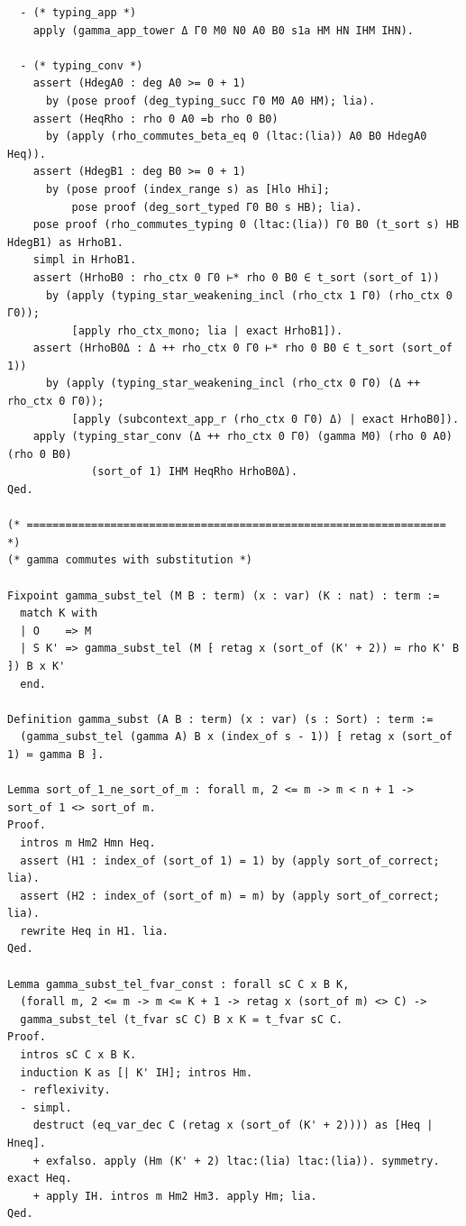 \begin{latin}
\begin{verbatim}
  - (* typing_app *)
    apply (gamma_app_tower Δ Γ0 M0 N0 A0 B0 s1a HM HN IHM IHN).

  - (* typing_conv *)
    assert (HdegA0 : deg A0 >= 0 + 1)
      by (pose proof (deg_typing_succ Γ0 M0 A0 HM); lia).
    assert (HeqRho : rho 0 A0 =b rho 0 B0)
      by (apply (rho_commutes_beta_eq 0 (ltac:(lia)) A0 B0 HdegA0 Heq)).
    assert (HdegB1 : deg B0 >= 0 + 1)
      by (pose proof (index_range s) as [Hlo Hhi];
          pose proof (deg_sort_typed Γ0 B0 s HB); lia).
    pose proof (rho_commutes_typing 0 (ltac:(lia)) Γ0 B0 (t_sort s) HB HdegB1) as HrhoB1.
    simpl in HrhoB1.
    assert (HrhoB0 : rho_ctx 0 Γ0 ⊢* rho 0 B0 ∈ t_sort (sort_of 1))
      by (apply (typing_star_weakening_incl (rho_ctx 1 Γ0) (rho_ctx 0 Γ0));
          [apply rho_ctx_mono; lia | exact HrhoB1]).
    assert (HrhoB0Δ : Δ ++ rho_ctx 0 Γ0 ⊢* rho 0 B0 ∈ t_sort (sort_of 1))
      by (apply (typing_star_weakening_incl (rho_ctx 0 Γ0) (Δ ++ rho_ctx 0 Γ0));
          [apply (subcontext_app_r (rho_ctx 0 Γ0) Δ) | exact HrhoB0]).
    apply (typing_star_conv (Δ ++ rho_ctx 0 Γ0) (gamma M0) (rho 0 A0) (rho 0 B0)
             (sort_of 1) IHM HeqRho HrhoB0Δ).
Qed.

(* ================================================================= *)
(* gamma commutes with substitution *)

Fixpoint gamma_subst_tel (M B : term) (x : var) (K : nat) : term :=
  match K with
  | O    => M
  | S K' => gamma_subst_tel (M ⁅ retag x (sort_of (K' + 2)) ≔ rho K' B ⁆) B x K'
  end.

Definition gamma_subst (A B : term) (x : var) (s : Sort) : term :=
  (gamma_subst_tel (gamma A) B x (index_of s - 1)) ⁅ retag x (sort_of 1) ≔ gamma B ⁆.

Lemma sort_of_1_ne_sort_of_m : forall m, 2 <= m -> m < n + 1 -> sort_of 1 <> sort_of m.
Proof.
  intros m Hm2 Hmn Heq.
  assert (H1 : index_of (sort_of 1) = 1) by (apply sort_of_correct; lia).
  assert (H2 : index_of (sort_of m) = m) by (apply sort_of_correct; lia).
  rewrite Heq in H1. lia.
Qed.

Lemma gamma_subst_tel_fvar_const : forall sC C x B K,
  (forall m, 2 <= m -> m <= K + 1 -> retag x (sort_of m) <> C) ->
  gamma_subst_tel (t_fvar sC C) B x K = t_fvar sC C.
Proof.
  intros sC C x B K.
  induction K as [| K' IH]; intros Hm.
  - reflexivity.
  - simpl.
    destruct (eq_var_dec C (retag x (sort_of (K' + 2)))) as [Heq | Hneq].
    + exfalso. apply (Hm (K' + 2) ltac:(lia) ltac:(lia)). symmetry. exact Heq.
    + apply IH. intros m Hm2 Hm3. apply Hm; lia.
Qed.


\end{verbatim}
\end{latin}
